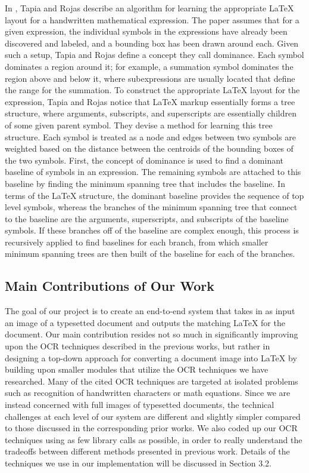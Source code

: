 \documentclass[10pt]{IEEEtran}
\newcommand{\latex}{\LaTeX\xspace}
\begin{document}
In \cite{4}, Tapia and Rojas describe an algorithm for learning the appropriate \latex layout for a handwritten mathematical expression. The paper assumes that for a given expression, the individual symbols in the expressions have already been discovered and labeled, and a bounding box has been drawn around each. Given such a setup, Tapia and Rojas define a concept they call dominance. Each symbol dominates a region around it; for example, a summation symbol dominates the region above and below it, where subexpressions are usually located that define the range for the summation. To construct the appropriate \latex layout for the expression, Tapia and Rojas notice that \latex markup essentially forms a tree structure, where arguments, subscripts, and superscripts are essentially children of some given parent symbol. They devise a method for learning this tree structure. Each symbol is treated as a node and edges between two symbols are weighted based on the distance between the centroids of the bounding boxes of the two symbols. First, the concept of dominance is used to find a dominant baseline of symbols in an expression. The remaining symbols are attached to this baseline by finding the minimum spanning tree that includes the baseline. In terms of the \latex structure, the dominant baseline provides the sequence of top level symbols, whereas the branches of the minimum spanning tree that connect to the baseline are the arguments, superscripts, and subscripts of the baseline symbols. If these branches off of the baseline are complex enough, this process is recursively applied to find baselines for each branch, from which smaller minimum spanning trees are then built of the baseline for each of the branches.   

\subsection{Main Contributions of Our Work}

The goal of our project is to create an end-to-end system that takes in as input an image of a typesetted document and outputs the matching \latex for the document. Our main contribution resides not so much in significantly improving upon the OCR techniques described in the previous works, but rather in designing a top-down approach for converting a document image into \latex by building upon smaller modules that utilize the OCR techniques we have researched. Many of the cited OCR techniques are targeted at isolated problems such as recognition of handwritten characters or math equations. Since we are instead concerned with full images of typesetted documents, the technical challenges at each level of our system are different and slightly simpler compared to those discussed in the corresponding prior works. We also coded up our OCR techniques using as few library calls as possible, in order to really understand the tradeoffs between different methods presented in previous work. Details of the techniques we use in our implementation will be discussed in Section 3.2.
\end{document}
